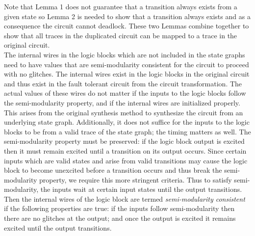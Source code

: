 \documentclass[12pt]{report}
\begin{document}
Note that Lemma 1 does not guarantee that a transition always exists from a given state so Lemma 2 is needed to show that a transition always exists and as a consequence the circuit cannot deadlock.  These two Lemmas combine together to show that all traces in the duplicated circuit can be mapped to a trace in the original circuit.\\%

The internal wires in the logic blocks which are not included in the state graphs need to have values that are semi-modularity consistent for the circuit to proceed with no glitches.  The internal wires exist in the logic blocks in the original circuit and thus exist in the fault tolerant circuit from the circuit transformation.  The actual values of these wires do not matter if the inputs to the logic blocks follow the semi-modularity property, and if the internal wires are initialized properly.  This arises from the original synthesis method to synthesize the circuit from an underlying state graph.  
Additionally, it does not suffice for the inputs to the logic blocks to be from a valid trace of the state graph; the timing matters as well.  The semi-modularity property must be preserved:  if the logic block output is excited then it must remain excited until a transition on its output occurs.  Since certain inputs which are valid states and arise from valid transitions may cause the logic block to become unexcited before a transition occurs and thus break the semi-modularity property, we require this more stringent criteria.  %
Thus to satisfy semi-modularity, the inputs wait at certain input states until the output transitions.  Then the internal wires of the logic block are termed {\em semi-modularity consistent} if the following properties are true:  if the inputs follow semi-modularity then there are no glitches at the output; and once the output is excited it remains excited until the output transitions. \\%
\end{document}
